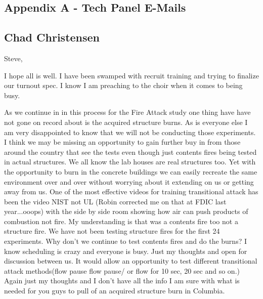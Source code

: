 \documentclass[12pt,oneside]{book}
\begin{document}

\newpage

\begin{appendix}

\chapter*{Appendix A - Tech Panel E-Mails}
\label{panel_responses}

\section{Chad Christensen}

Steve,
 
I hope all is well.  I have been swamped with recruit training and trying to finalize our turnout spec. I know I am preaching to the choir when it comes to being busy.  
 
As we continue in in this process for the Fire Attack study one thing have have not gone on record about is the acquired structure burns.  As is everyone else I am very disappointed to know that we will not be conducting those experiments. I think we may be missing an opportunity to gain further buy in from those around the country that see the tests even though just contents fires being tested in actual structures.  We all know the lab houses are real structures too.  Yet with the opportunity to burn in the concrete buildings we can easily recreate the same environment over and over without worrying about it extending on us or getting away from us.  One of the most effective videos for training transitional attack  has been the video NIST not UL (Robin corrected me on that at FDIC last year...ooops) with the side by side room showing how air can push products of combustion not fire. My understanding is that was a contents fire too not a structure fire.  We have not been testing structure fires for the first 24 experiments.  Why don't we continue to test contents fires and do the burns?  I know scheduling is crazy and everyone is busy. Just my thoughts and open for discussion between us.  It would allow an opportunity to test different transitional attack methods(flow pause flow pause/ or flow for 10 sec, 20 sec and so on.)  Again just my thoughts and I don't have all the info I am sure with what is needed for you guys to pull of an acquired structure burn in Columbia.   
 

\end{appendix}
\end{document}
